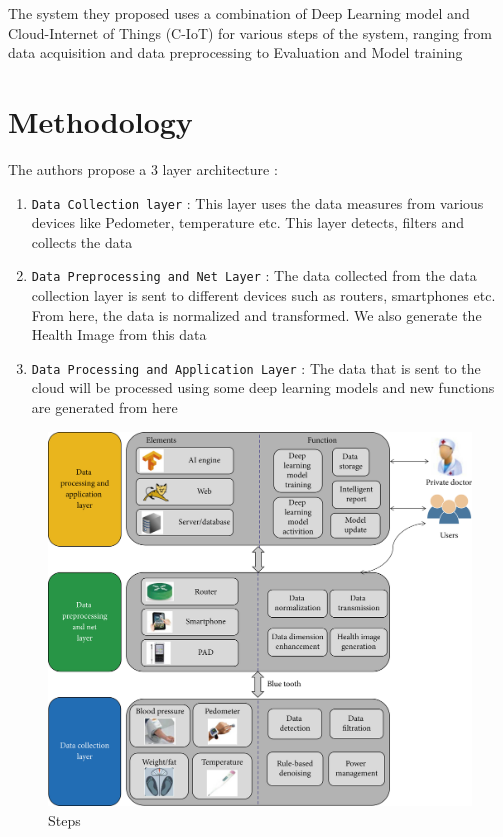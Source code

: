 \documentclass{article}
\begin{document}
The system they proposed uses a combination of Deep Learning model and Cloud-Internet of Things (C-IoT) for various steps of the system, ranging from data acquisition and data preprocessing to Evaluation and Model training 

\section{Methodology}
The authors propose a 3 layer architecture : 
\begin{enumerate}
    \item \texttt{Data Collection layer} : This layer uses the data measures from various devices like Pedometer, temperature etc. This layer detects, filters and collects the data
    \item \texttt{Data Preprocessing and Net Layer} : The data collected from the data collection layer is sent to different devices such as routers, smartphones etc. From here, the data is normalized and transformed. We also generate the Health Image from this data
    \item \texttt{Data Processing and Application Layer} : The data that is sent to the cloud will be processed using some deep learning models and new functions are generated from here
\end{enumerate}

\begin{figure}
    \centering
    \includegraphics[width=\linewidth]{4109102.fig.001.png}
    \caption{Steps}
    \label{fig:label1}
\end{figure}
\end{document}
